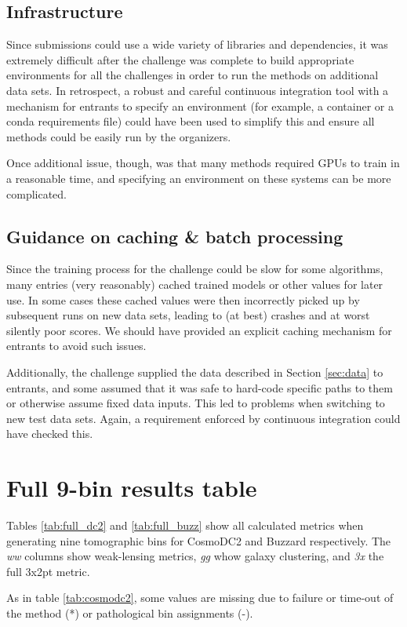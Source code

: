 \documentclass[twocolumn,twocolappendix]{aastex63}
\begin{document}
\subsection{Infrastructure}
Since submissions could use a wide variety of libraries and dependencies, it was extremely
difficult after the challenge was complete to build appropriate environments for all the challenges
in order to run the methods on additional data sets. In retrospect, a robust and careful
continuous integration tool with a mechanism for entrants to specify an environment (for example, a 
container or a {\sc conda} requirements file) could have been used to simplify this and ensure
all methods could be easily run by the organizers.

Once additional issue, though, was that many methods required GPUs to train in a reasonable time,
and specifying an environment on these systems can be more complicated.

\subsection{Guidance on caching \& batch processing}
Since the training process for the challenge could be slow for some algorithms, many entries
(very reasonably) cached trained models or other values for later use.  In some cases these
cached values were then incorrectly picked up by subsequent runs on new data sets, leading
to (at best) crashes and at worst silently poor scores.  We should have provided an explicit
caching mechanism for entrants to avoid such issues.

Additionally, the challenge supplied the data described in Section \ref{sec:data} to entrants,
and some assumed that it was safe to hard-code specific paths to them or
otherwise assume fixed data inputs.  This led to problems when switching to new test data sets. 
Again, a requirement enforced by continuous integration could have checked this.

\section{Full 9-bin results table}
Tables \ref{tab:full_dc2} and \ref{tab:full_buzz} show all calculated metrics when generating nine tomographic 
bins for CosmoDC2 and Buzzard respectively. The \textit{ww} columns
show weak-lensing metrics, \textit{gg} whow galaxy clustering, and \textit{3x} the full 3x2pt metric.


As in table \ref{tab:cosmodc2}, some values are missing due to failure or time-out of the method (*) or pathological bin assignments (-).
\end{document}
